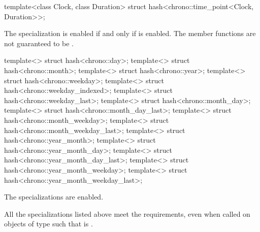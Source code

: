 %
\begin{itemdecl}
template<class Clock, class Duration> struct hash<chrono::time_point<Clock, Duration>>;
\end{itemdecl}

\begin{itemdescr}
\pnum
The specialization  is enabled
if and only if  is enabled.
The member functions are not guaranteed to be .
\end{itemdescr}

%
%
%
%
%
%
%
%
%
%
%
%
%
%
%
\begin{itemdecl}
template<> struct hash<chrono::day>;
template<> struct hash<chrono::month>;
template<> struct hash<chrono::year>;
template<> struct hash<chrono::weekday>;
template<> struct hash<chrono::weekday_indexed>;
template<> struct hash<chrono::weekday_last>;
template<> struct hash<chrono::month_day>;
template<> struct hash<chrono::month_day_last>;
template<> struct hash<chrono::month_weekday>;
template<> struct hash<chrono::month_weekday_last>;
template<> struct hash<chrono::year_month>;
template<> struct hash<chrono::year_month_day>;
template<> struct hash<chrono::year_month_day_last>;
template<> struct hash<chrono::year_month_weekday>;
template<> struct hash<chrono::year_month_weekday_last>;
\end{itemdecl}

\begin{itemdescr}
\pnum
The specializations are enabled.
\begin{note}
All the  specializations listed above meet the
 requirements, even when called on objects 
of type  such that  is .
\end{note}
\end{itemdescr}

